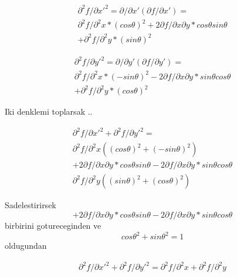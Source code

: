 \documentclass[12pt]{article}
\begin{document}
\begin{equation}
\begin{split}
\partial ^{2}f/\partial x'^{2} = \partial /\partial x'\left ( \partial f/\partial x' \right ) = \\
\partial ^{2} f / \partial ^{2}x * \left ( cos\theta \right )^{2} + 2 \partial f/\partial x \partial y *cos\theta sin\theta   \\
+ \partial ^{2} f / \partial ^{2}y * \left (sin\theta \right )^{2} 
\end{split}
\end{equation}

\begin{equation}
\begin{split}
\partial ^{2}f/\partial y'^{2} = \partial /\partial y'\left ( \partial f/\partial y' \right ) = \\
\partial ^{2} f / \partial ^{2}x * \left ( -sin\theta \right )^{2} - 2 \partial f/\partial x \partial y *sin\theta cos\theta   \\
+ \partial ^{2} f / \partial ^{2}y * \left (cos\theta \right )^{2} 
\end{split}
\end{equation}

Iki denklemi toplarsak ..

\begin{equation}
\begin{split}
\partial ^{2}f/\partial x'^{2} + \partial ^{2}f/\partial y'^{2} = \\
 \partial ^{2}f/\partial ^{2}x \left ( \left ( cos\theta \right )^{2} + \left ( -sin\theta \right )^{2} \right ) \\
+ 2 \partial f/\partial x \partial y *cos\theta sin\theta  - 2 \partial f/\partial x \partial y *sin\theta cos\theta \\
 \partial ^{2}f/\partial ^{2}y \left ( \left ( sin\theta \right )^{2} + \left ( cos\theta \right )^{2} \right )
\end{split}
\end{equation}

Sadelestirirsek
$$+ 2 \partial f/\partial x \partial y *cos\theta sin\theta  - 2 \partial f/\partial x \partial y *sin\theta cos\theta$$ 
birbirini gotureceginden ve $$ cos\theta ^{2} + sin\theta ^{2} = 1$$ oldugundan

\begin{equation}
\begin{split}
\partial ^{2}f/\partial x'^{2} + \partial ^{2}f/\partial y'^{2} =  \partial ^{2}f/\partial ^{2}x +  \partial ^{2}f/\partial ^{2}y
\end{split}
\end{equation}
\end{document}
